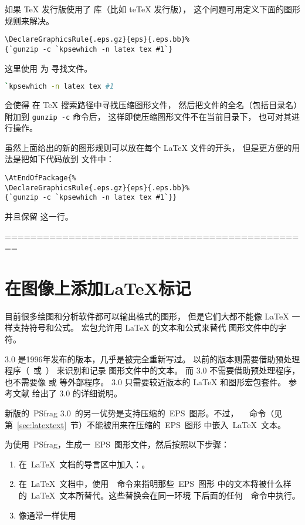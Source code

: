 如果 \TeX{} 发行版使用了  库（比如 te\TeX{} 发行版），
这个问题可用定义下面的图形规则来解决。
\begin{lstlisting}
\DeclareGraphicsRule{.eps.gz}{eps}{.eps.bb}%
{`gunzip -c `kpsewhich -n latex tex #1`}
\end{lstlisting}
这里使用  为  寻找文件。
\begin{lstlisting}[language=bash]
`kpsewhich -n latex tex #1
\end{lstlisting}
会使得  在 \TeX{} 搜索路径中寻找压缩图形文件，
然后把文件的全名（包括目录名）附加到 \texttt{gunzip -c} 命令后，
这样即使压缩图形文件不在当前目录下， 也可对其进行操作。

虽然上面给出的新的图形规则可以放在每个 \LaTeX{} 文件的开头，
但是更方便的用法是把如下代码放到  文件中：
\begin{lstlisting}
\AtEndOfPackage{%
\DeclareGraphicsRule{.eps.gz}{eps}{.eps.bb}%
{`gunzip -c `kpsewhich -n latex tex #1`}}
\end{lstlisting}
并且保留  这一行。

================================================

\section{在图像上添加\LaTeX{}标记}\label{sec:psfrag}

目前很多绘图和分析软件都可以输出格式的图形，
但是它们大都不能像 \LaTeX{} 一样支持符号和公式。
 宏包允许用 \LaTeX{} 的文本和公式来替代  图形文件中的字符。

 3.0 是1996年发布的版本，几乎是被完全重新写过。
以前的版本则需要借助预处理程序（~或~）
来识别和记录  图形文件中的文本。
而 3.0 不需要借助预处理程序，
也不需要像  或  等外部程序。
 3.0 只需要较近版本的 \LaTeX{} 和图形宏包套件。
参考文献 \cite{psfrag-doc} 给出了 3.0 的详细说明。






新版的~\textsf{PSfrag 3.0}~的另一优势是支持压缩的~EPS~图形。不过，
~~命令（见第~\ref{sec:latextext}~节）不能被用来在压缩的~EPS~图形
中嵌入~\LaTeX{}~文本。

为使用~\textsf{PSfrag}，生成一~EPS~图形文件，然后按照以下步骤：
\begin{enumerate}
\item 在~\LaTeX{}~文档的导言区中加入：。
\item 在~\LaTeX{}~文档中，使用~~命令来指明那些~EPS~图形
      中的文本将被什么样的~\LaTeX{}~文本所替代。这些替换会在同一环境
      下后面的任何~~命令中执行。
\item 像通常一样使用~
\end{enumerate}

